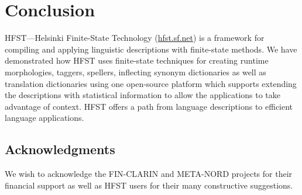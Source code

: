 \documentclass{llncs}
\begin{document}


\section{Conclusion}
HFST---Helsinki Finite-State Technology (\url{hfst.sf.net})
is a framework for compiling and applying linguistic descriptions
with finite-state methods. We have demonstrated how HFST uses finite-state techniques 
for creating runtime morphologies, taggers, spellers, inflecting synonym dictionaries as well as 
translation dictionaries using one open-source platform which supports extending  
the descriptions with statistical information to allow the applications 
to take advantage of context. HFST offers a path from language descriptions 
to efficient language applications.

\subsection*{Acknowledgments}
We wish to acknowledge the FIN-CLARIN and META-NORD projects for their financial support 
as well as HFST users for their many constructive suggestions. 




\end{document}
